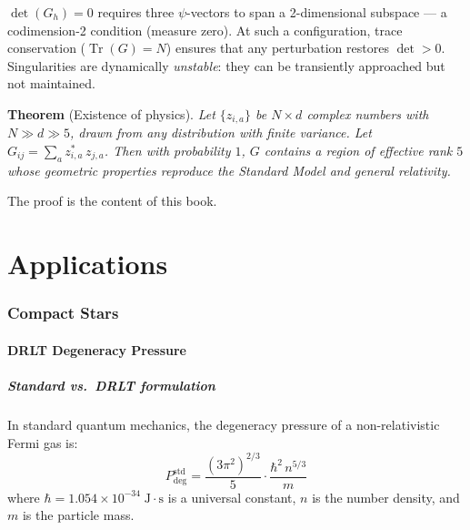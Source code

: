 \documentclass[12pt]{article}
\theoremstyle{remark}
\theoremstyle{definition}
\begin{document}
$\det(G_h) = 0$ requires three $\psi$-vectors to span a 2-dimensional subspace --- a codimension-2 condition (measure zero).  At such a configuration, trace conservation ($\operatorname{Tr}(G) = N$) ensures that any perturbation restores $\det > 0$.  Singularities are dynamically \emph{unstable}: they can be transiently approached but not maintained.

\bigskip

\noindent\textbf{Theorem} (Existence of physics). \emph{Let $\{z_{i,a}\}$ be $N \times d$ complex numbers with $N \gg d \gg 5$, drawn from any distribution with finite variance. Let $G_{ij} = \sum_a z^*_{i,a}\,z_{j,a}$. Then with probability $1$, $G$ contains a region of effective rank $5$ whose geometric properties reproduce the Standard Model and general relativity.}

\bigskip

\noindent The proof is the content of this book.

\part{Applications}

\section{Compact Stars}
\label{ch:compact_stars}

\subsection{DRLT Degeneracy Pressure}

\subsubsection{Standard vs.\ DRLT formulation}

In standard quantum mechanics, the degeneracy pressure of a non-relativistic Fermi gas is:
\begin{equation}
P_\text{deg}^\text{std} = \frac{(3\pi^2)^{2/3}}{5} \cdot \frac{\hbar^2\,n^{5/3}}{m}
\label{eq:Pstd}
\end{equation}
where $\hbar = 1.054 \times 10^{-34}\;\text{J}\cdot\text{s}$ is a universal constant, $n$ is the number density, and $m$ is the particle mass.
\end{document}
